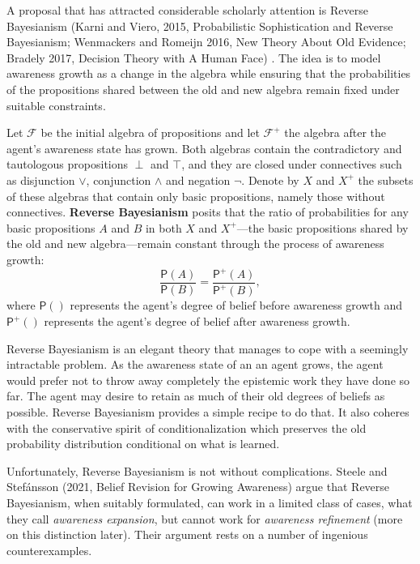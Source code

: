 \documentclass[
  11pt,
  dvipsnames,enabledeprecatedfontcommands]{scrartcl}
\newcommand{\pr}[1]{\ensuremath{\mathsf{P}(#1)}}
\newcommand{\ppr}[2]{\ensuremath{\mathsf{P}^{#1}(#2)}}
\begin{document}
A proposal that has attracted considerable scholarly attention is
Reverse Bayesianism (Karni and Viero, 2015, Probabilistic Sophistication
and Reverse Bayesianism; Wenmackers and Romeijn 2016, New Theory About
Old Evidence; Bradely 2017, Decision Theory with A Human Face) . The
idea is to model awareness growth as a change in the algebra while
ensuring that the probabilities of the propositions shared between the
old and new algebra remain fixed under suitable constraints.

Let \(\mathcal{F}\) be the initial algebra of propositions and let
\(\mathcal{F}^+\) the algebra after the agent's awareness state has
grown. Both algebras contain the contradictory and tautologous
propositions \(\perp\) and \(\top\), and they are closed under
connectives such as disjunction \(\vee\), conjunction \(\wedge\) and
negation \(\neg\). Denote by \(X\) and \(X^+\) the subsets of these
algebras that contain only basic propositions, namely those without
connectives. \textbf{Reverse Bayesianism} posits that the ratio of
probabilities for any basic propositions \(A\) and \(B\) in both \(X\)
and \(X^+\)---the basic propositions shared by the old and new
algebra---remain constant through the process of awareness growth:
\[\frac{\pr{A}}{\pr{B}} = \frac{\ppr{+}{A}}{\ppr{+}{B}},\] where
\(\pr{}\) represents the agent's degree of belief before awareness
growth and \(\ppr{+}{}\) represents the agent's degree of belief after
awareness growth.

Reverse Bayesianism is an elegant theory that manages to cope with a
seemingly intractable problem. As the awareness state of an an agent
grows, the agent would prefer not to throw away completely the epistemic
work they have done so far. The agent may desire to retain as much of
their old degrees of beliefs as possible. Reverse Bayesianism provides a
simple recipe to do that. It also coheres with the conservative spirit
of conditionalization which preserves the old probability distribution
conditional on what is learned.

Unfortunately, Reverse Bayesianism is not without complications. Steele
and Stefánsson (2021, Belief Revision for Growing Awareness) argue that
Reverse Bayesianism, when suitably formulated, can work in a limited
class of cases, what they call \textit{awareness expansion}, but cannot
work for \textit{awareness refinement} (more on this distinction later).
Their argument rests on a number of ingenious counterexamples.
\end{document}

